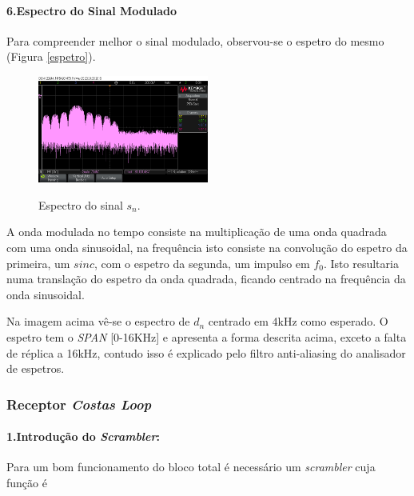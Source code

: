 \documentclass[11pt]{article}
\numberwithin{equation}{section}
\begin{document}
\paragraph{6.Espectro do Sinal Modulado} \hspace{0pt}
 
Para compreender melhor o sinal modulado, observou-se o espetro do mesmo (Figura \ref{espetro}).
\begin{figure}[H]
	\centering
	\includegraphics[width=0.5\textwidth]{./spectrum_sn_0-16k}~\\
	\caption{Espectro do sinal $s_n$.}
	\label{espetrosn}
\end{figure}
A onda modulada no tempo consiste na multiplicação de uma onda quadrada com uma onda sinusoidal, na frequência isto consiste na convolução do espetro da primeira, um $sinc$, com o espetro da segunda, um impulso em $f_0$. Isto resultaria numa translação do espetro da onda quadrada, ficando centrado na frequência da onda sinusoidal.

Na imagem acima vê-se o espectro de $d_n$ centrado em 4kHz como esperado. O espetro tem o \textit{SPAN} [0-16KHz] e apresenta a forma descrita acima, exceto a falta de réplica a 16kHz, contudo isso é explicado pelo filtro anti-aliasing do analisador de espetros.

\subsubsection{Receptor \textit{Costas Loop}}

\paragraph{1.Introdução do \textit{Scrambler}:} \hspace{0pt}


Para um bom funcionamento do bloco total é necessário um \textit{scrambler} cuja função é

\end{document}
